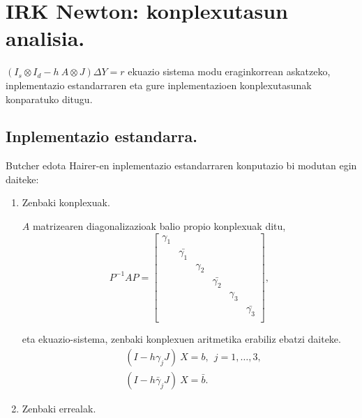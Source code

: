  
\section{IRK Newton: konplexutasun analisia.}

$(I_s \otimes I_d - h \ A \otimes J) \Delta Y = r$ ekuazio sistema modu eraginkorrean askatzeko, inplementazio estandarraren eta gure inplementazioen konplexutasunak konparatuko ditugu.

\subsection*{Inplementazio estandarra.}

Butcher edota Hairer-en inplementazio estandarraren konputazio bi modutan egin daiteke:

\begin{enumerate}
\item Zenbaki konplexuak.

$A$ matrizearen diagonalizazioak balio propio konplexuak ditu, 
\begin{equation*}
P^{-1}AP=\begin{bmatrix}
  \gamma_1 &                &          &                &           &                 \\
           & \bar{\gamma_1} &          &                &           &                 \\
           &                & \gamma_2 &                &           &                 \\
           &                &          & \bar{\gamma_2} &           &                 \\ 
           &                &          &                & \gamma_3   &                 \\
           &                &          &                &            & \bar{\gamma_3} \\  
\end{bmatrix},
\end{equation*}

eta ekuazio-sistema, zenbaki konplexuen aritmetika erabiliz ebatzi daiteke.
\begin{align*}
&(I-h \gamma_j J) \ X = b, \ \ j=1,\dots,3, \\
&(I-h \bar{\gamma}_j J) \ X = \bar{b}. 
\end{align*}

\item Zenbaki errealak.


\end{enumerate}
